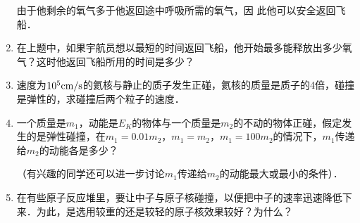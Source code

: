 \begin{enumerate}
\begin{solution}
由于他剩余的氧气多于他返回途中呼吸所需的氧气，因
此他可以安全返回飞船．
\end{solution}

\item 在上题中，如果宇航员想以最短的时间返回飞船，他开始最多能释放出多少氧气？这时他返回飞船所用的时间是多少？
\item 速度为$10^5{\rm cm}/{\rm s}$的氦核与静止的质子发生正碰，氦核的质量是质子的4倍，碰撞是弹性的，求碰撞后两个粒子的速度．
\item 一个质量是$m_1$，动能是$E_K$的物体与一个质量是$m_2$的不动的物体正碰，假定发生的是弹性碰撞，在$m_1=0.01m_2$，$m_1=m_2$，$m_1=100m_2$的情况下，$m_1$传递给$m_2$的动能各是多少？

（有兴趣的同学还可以进一步讨论$m_1$传递给$m_2$的动能最大或最小的条件）．

\item 在有些原子反应堆里，要让中子与原子核碰撞，以便把中子的速率迅速降低下来．为此，是选用较重的还是较轻的原子核效果较好？为什么？
\end{enumerate}

